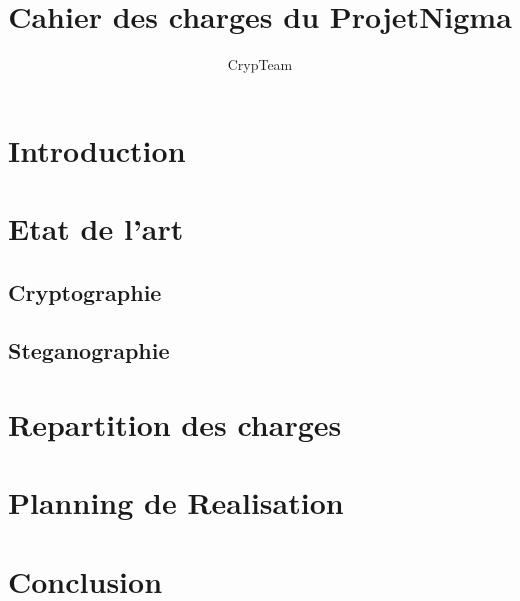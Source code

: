 \documentclass[a4paper,12pt]{article}
\title{Cahier des charges du ProjetNigma}
\author{CrypTeam}
\date{}
\begin{document}
	\maketitle{}
  	\tableofcontents
	\newpage				
	\section{Introduction}
	\newpage
	\section{Etat de l'art}
		\subsection{Cryptographie}
		\subsection{Steganographie}
	\newpage
	\section{Repartition des charges}
	\section{Planning de Realisation} %
	\section{Conclusion}
\end{document}
